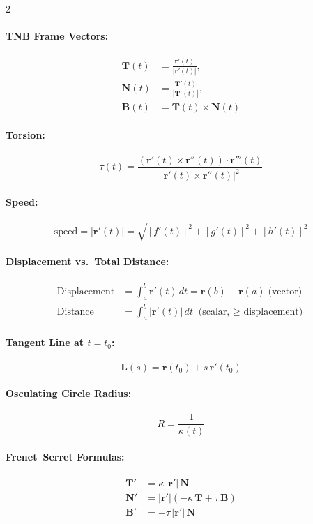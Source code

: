 \begin{multicols}{2}
\paragraph{TNB Frame Vectors:}
\begin{align*}
\mathbf{T}(t) &= \frac{\mathbf{r}'(t)}{|\mathbf{r}'(t)|}, \\
\mathbf{N}(t) &= \frac{\mathbf{T}'(t)}{|\mathbf{T}'(t)|}, \\
\mathbf{B}(t) &= \mathbf{T}(t) \times \mathbf{N}(t)
\end{align*}

\paragraph{Torsion:}
\[
\tau(t) = \frac{(\mathbf{r}'(t) \times \mathbf{r}''(t)) \cdot \mathbf{r}'''(t)}{|\mathbf{r}'(t) \times \mathbf{r}''(t)|^2}
\]

\paragraph{Speed:}
\[
\text{speed} = |\mathbf{r}'(t)| = \sqrt{[f'(t)]^2 + [g'(t)]^2 + [h'(t)]^2}
\]

\paragraph{Displacement vs.\ Total Distance:}
\begin{align*}
\text{Displacement} &= \int_a^b \mathbf{r}'(t)\,dt = \mathbf{r}(b) - \mathbf{r}(a) \;\text{(vector)}\\
\text{Distance} &= \int_a^b |\mathbf{r}'(t)|\,dt \;\text{(scalar, $\geq$ displacement)}
\end{align*}

\paragraph{Tangent Line at $t = t_0$:}
\[
\mathbf{L}(s) = \mathbf{r}(t_0) + s\,\mathbf{r}'(t_0)
\]

\paragraph{Osculating Circle Radius:}
\[
R = \frac{1}{\kappa(t)}
\]

\paragraph{Frenet--Serret Formulas:}
\begin{align*}
\mathbf{T}' &= \kappa\,|\mathbf{r}'|\,\mathbf{N}\\
\mathbf{N}' &= |\mathbf{r}'|(-\kappa\,\mathbf{T} + \tau\,\mathbf{B})\\
\mathbf{B}' &= -\tau\,|\mathbf{r}'|\,\mathbf{N}
\end{align*}


\end{multicols}
